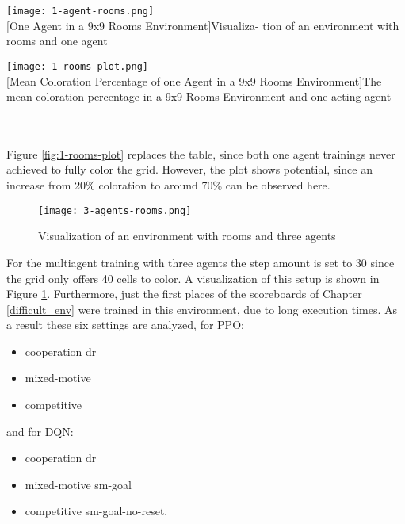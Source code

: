 \begin{minipage}{\textwidth}
  \begin{minipage}[b]{0.29\textwidth}
    \centering
    \texttt{[image: 1-agent-rooms.png]}\\
    [One Agent in a 9x9 Rooms Environment]{Visualiza- tion of an environment with rooms and one agent}\label{fig:1-agent-rooms}
  \end{minipage}
  \hfill
  \begin{minipage}[b]{0.69\textwidth}
    \centering
    \texttt{[image: 1-rooms-plot.png]}\\
    [Mean Coloration Percentage of one Agent in a 9x9 Rooms Environment]{The mean coloration percentage in a 9x9 Rooms Environment and one acting agent \\}\label{fig:1-rooms-plot}
    \end{minipage}
  \end{minipage}\\\\

Figure \ref{fig:1-rooms-plot} replaces the table, since both one agent trainings never achieved to fully color the grid. However, the plot shows potential, since an increase from 20\% coloration to around 70\% can be observed here.

\begin{figure}[hpbt]
    \centering
    \texttt{[image: 3-agents-rooms.png]}\\
    \caption[Three Agents in a 9x9 Rooms Environment]{Visualization of an environment with rooms and three agents}\label{fig:3-agents-rooms}
\end{figure}

For the multiagent training with three agents the step amount is set to 30 since the grid only offers 40 cells to color. A visualization of this setup is shown in Figure \ref{fig:3-agents-rooms}. Furthermore, just the first places of the scoreboards of Chapter \ref{difficult_env} were trained in this environment, due to long execution times. As a result these six settings are analyzed, for PPO:
\begin{itemize}
    \item cooperation dr
    \item mixed-motive
    \item competitive
\end{itemize}
    and for DQN:
\begin{itemize}
    \item cooperation dr
    \item mixed-motive sm-goal
    \item competitive sm-goal-no-reset.
\end{itemize}

